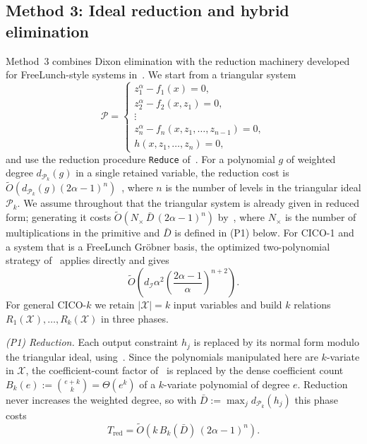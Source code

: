 \subsection{Method 3: Ideal reduction and hybrid elimination}\label{subsec:method3}
Method~3 combines Dixon elimination with the reduction machinery developed for FreeLunch-style systems in~\cite{DBLP:conf/crypto/BariantBBHOR25}. We start from a triangular system
\begin{equation}
\mathcal{P}=\left\{
\begin{array}{l}
z_1^\alpha-f_1(x)=0,\\
z_2^\alpha-f_2(x,z_1)=0,\\
\vdots\\
z_n^\alpha-f_n(x,z_1,\ldots,z_{n-1})=0,\\
h(x,z_1,\ldots,z_n)=0,
\end{array}
\right.
\label{eq:freelunch_system}
\end{equation}
and use the reduction procedure \texttt{Reduce} of~\cite[Algorithm~1]{DBLP:conf/crypto/BariantBBHOR25}. For a polynomial $g$ of weighted degree $d_{\mathcal{P}_k}(g)$ in a single retained variable, the reduction cost is $\widetilde{O}(d_{\mathcal{P}_k}(g)(2\alpha-1)^n)$~\cite[Lemma~1]{DBLP:conf/crypto/BariantBBHOR25}, where $n$ is the number of levels in the triangular ideal $\mathcal{P}_k$. We assume throughout that the triangular system is already given in reduced form; generating it costs $\widetilde{O}(N_{\times}\,\bar{D}\,(2\alpha-1)^n)$ by~\cite[Proposition~4]{DBLP:conf/crypto/BariantBBHOR25}, where $N_{\times}$ is the number of multiplications in the primitive and $\bar{D}$ is defined in (P1) below. For CICO-1 and a system that is a FreeLunch Gr\"obner basis, the optimized two-polynomial strategy of~\cite[Corollary~3]{DBLP:conf/crypto/BariantBBHOR25} applies directly and gives
\begin{equation}
\widetilde{O}\!\left(d_{\mathcal{I}}\alpha^2\left(\frac{2\alpha-1}{\alpha}\right)^{n+2}\right).
\label{eq:two_poly_complexity_main}
\end{equation}
For general CICO-$k$ we retain $|\mathcal{X}|=k$ input variables and build $k$ relations $R_1(\mathcal{X}),\ldots,R_k(\mathcal{X})$ in three phases.

\emph{(P1) Reduction.} Each output constraint $h_j$ is replaced by its normal form modulo the triangular ideal, using~\cite[Algorithm~1]{DBLP:conf/crypto/BariantBBHOR25}. Since the polynomials manipulated here are $k$-variate in $\mathcal{X}$, the coefficient-count factor of~\cite[Lemma~1]{DBLP:conf/crypto/BariantBBHOR25} is replaced by the dense coefficient count $B_k(e):=\binom{e+k}{k}=\Theta(e^{k})$ of a $k$-variate polynomial of degree $e$. Reduction never increases the weighted degree, so with $\bar{D}:=\max_j d_{\mathcal{P}_k}(h_j)$ this phase costs
\begin{equation}
	T_{\text{red}} = \widetilde{O}\!\left(k\,B_k(\bar{D})\,(2\alpha-1)^n\right).
	\label{eq:reduction_cost}
\end{equation}

